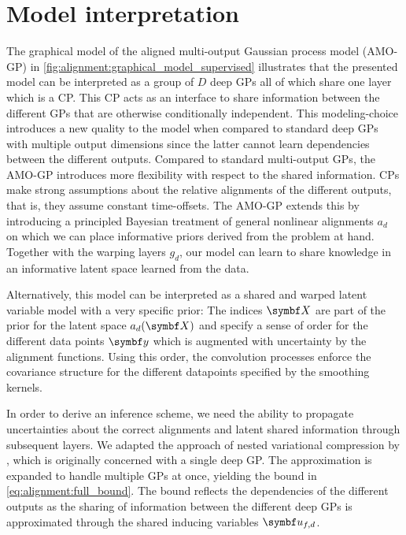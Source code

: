 \section{Model interpretation}
\label{toc:alignment:interpretation}
The graphical model of the aligned multi-output Gaussian process model (AMO-GP) in \cref{fig:alignment:graphical_model_supervised} illustrates that the presented model can be interpreted as a group of $D$ deep GPs all of which share one layer which is a CP.
This CP acts as an interface to share information between the different GPs that are otherwise conditionally independent.
This modeling-choice introduces a new quality to the model when compared to standard deep GPs with multiple output dimensions since the latter cannot learn dependencies between the different outputs.
Compared to standard multi-output GPs, the AMO-GP introduces more flexibility with respect to the shared information.
CPs make strong assumptions about the relative alignments of the different outputs, that is, they assume constant time-offsets.
The AMO-GP extends this by introducing a principled Bayesian treatment of general nonlinear alignments $a_d$ on which we can place informative priors derived from the problem at hand.
Together with the warping layers $g_d$, our model can learn to share knowledge in an informative latent space learned from the data.

Alternatively, this model can be interpreted as a shared and warped latent variable model with a very specific prior:
The indices $\mat{X}$ are part of the prior for the latent space $a_d(\mat{X})$ and specify a sense of order for the different data points $\mat{y}$ which is augmented with uncertainty by the alignment functions.
Using this order, the convolution processes enforce the covariance structure for the different datapoints specified by the smoothing kernels.

In order to derive an inference scheme, we need the ability to propagate uncertainties about the correct alignments and latent shared information through subsequent layers.
We adapted the approach of nested variational compression by \textcite{hensman_nested_2014}, which is originally concerned with a single deep GP.
The approximation is expanded to handle multiple GPs at once, yielding the bound in \cref{eq:alignment:full_bound}.
The bound reflects the dependencies of the different outputs as the sharing of information between the different deep GPs is approximated through the shared inducing variables $\rv{u}_{f,d}$.


